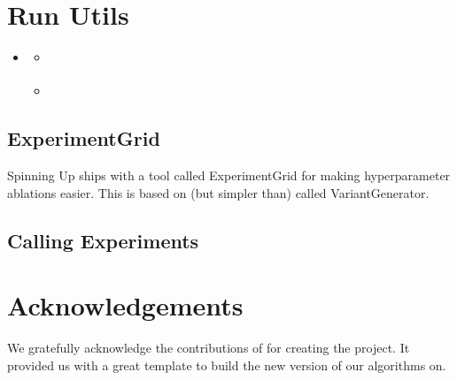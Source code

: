 \documentclass[letterpaper,10pt,english]{sphinxmanual}
\begin{document}
\chapter{Run Utils}
\label{\detokenize{utils/run_utils:run-utils}}\label{\detokenize{utils/run_utils::doc}}
\begin{sphinxShadowBox}
\begin{itemize}
\item {} 
\label{\detokenize{utils/run_utils:id1}}{\hyperref[\detokenize{utils/run_utils:run-utils}]{}}
\begin{itemize}
\item {} 
\label{\detokenize{utils/run_utils:id2}}{\hyperref[\detokenize{utils/run_utils:experimentgrid}]{}}

\item {} 
\label{\detokenize{utils/run_utils:id3}}{\hyperref[\detokenize{utils/run_utils:calling-experiments}]{}}

\end{itemize}

\end{itemize}
\end{sphinxShadowBox}


\section{ExperimentGrid}
\label{\detokenize{utils/run_utils:experimentgrid}}
Spinning Up ships with a tool called ExperimentGrid for making hyperparameter ablations easier. This is based on (but simpler than)  called VariantGenerator.


\section{Calling Experiments}
\label{\detokenize{utils/run_utils:calling-experiments}}

\chapter{Acknowledgements}
\label{\detokenize{etc/acknowledgements:acknowledgements}}\label{\detokenize{etc/acknowledgements::doc}}
We gratefully acknowledge the contributions of  for creating the  project.
It provided us with a great template to build the new version of our algorithms on.
\end{document}
